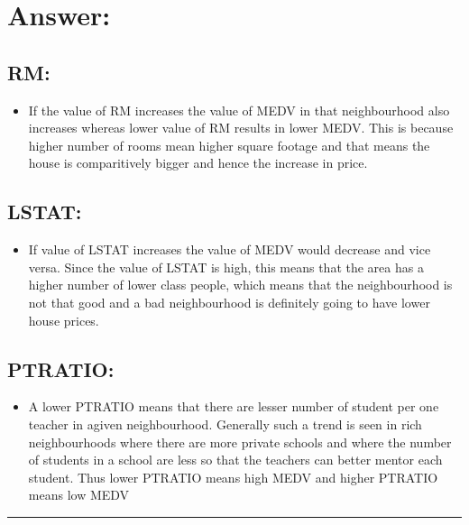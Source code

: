 \documentclass[11pt]{article}
\providecommand{\tightlist}{%
      \setlength{\itemsep}{0pt}\setlength{\parskip}{0pt}}
\begin{document}
    \section{Answer:}\label{answer}

\subsection{RM:}\label{rm}

\begin{itemize}
\tightlist
\item
  If the value of RM increases the value of MEDV in that neighbourhood
  also increases whereas lower value of RM results in lower MEDV. This
  is because higher number of rooms mean higher square footage and that
  means the house is comparitively bigger and hence the increase in
  price.
\end{itemize}

\subsection{LSTAT:}\label{lstat}

\begin{itemize}
\tightlist
\item
  If value of LSTAT increases the value of MEDV would decrease and vice
  versa. Since the value of LSTAT is high, this means that the area has
  a higher number of lower class people, which means that the
  neighbourhood is not that good and a bad neighbourhood is definitely
  going to have lower house prices.
\end{itemize}

\subsection{PTRATIO:}\label{ptratio}

\begin{itemize}
\tightlist
\item
  A lower PTRATIO means that there are lesser number of student per one
  teacher in agiven neighbourhood. Generally such a trend is seen in
  rich neighbourhoods where there are more private schools and where the
  number of students in a school are less so that the teachers can
  better mentor each student. Thus lower PTRATIO means high MEDV and
  higher PTRATIO means low MEDV
\end{itemize}

    \begin{center}\rule{0.5\linewidth}{\linethickness}\end{center}
\end{document}
